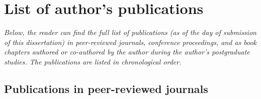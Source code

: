 \documentclass[10pt, a4paper, twoside, openright]{report}
\begin{document}
\pagestyle{myfancy2}

\chapter{List of author's publications\label{chap:authors_publications}}

\textsl{Below, the reader can find the full list of publications (as of the day of submission of this dissertation) in peer-reviewed journals, conference proceedings, and as book chapters authored or co-authored by the author during the author's postgraduate studies. The publications are listed in chronological order.}

\section{Publications in peer-reviewed journals\label{sec:peer_reviewed_journals}}
\end{document}
